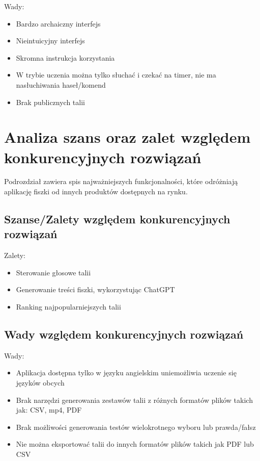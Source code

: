 Wady:
\begin{itemize}
    \item Bardzo archaiczny interfejs
    \item Nieintuicyjny interfejs
    \item Skromna instrukcja korzystania
    \item W trybie uczenia można tylko słuchać i czekać na timer, nie ma nasłuchiwania haseł/komend
    \item Brak publicznych talii
\end{itemize}

\section{Analiza szans oraz zalet względem konkurencyjnych rozwiązań}

Podrozdział zawiera spis najważniejszych funkcjonalności, które odróżniają aplikację fiszki od innych produktów dostępnych na rynku.

\subsection{Szanse/Zalety względem konkurencyjnych rozwiązań}

Zalety:
\begin{itemize}
    \item Sterowanie głosowe talii
    \item Generowanie treści fiszki, wykorzystując ChatGPT
    \item Ranking najpopularniejszych talii
\end{itemize}

\subsection{Wady względem konkurencyjnych rozwiązań}

Wady:
\begin{itemize}
    \item Aplikacja dostępna tylko w języku angielskim uniemożliwia uczenie się języków obcych
    \item Brak narzędzi generowania zestawów talii z różnych formatów plików takich jak: CSV, mp4, PDF
    \item Brak możliwości generowania testów wielokrotnego wyboru lub prawda/fałsz
    \item Nie można eksportować talii do innych formatów plików takich jak PDF lub CSV
\end{itemize}


